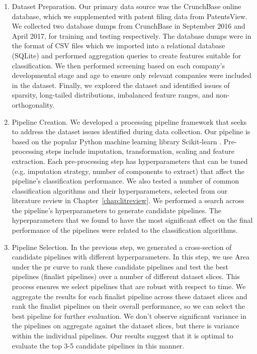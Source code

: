 \documentclass[../thesis/thesis.tex]{subfiles}
\begin{document}
\begin{enumerate}

\item Dataset Preparation. Our primary data source was the CrunchBase online database, which we supplemented with patent filing data from PatentsView. We collected two database dumps from CrunchBase in September 2016 and April 2017, for training and testing respectively. The database dumps were in the format of CSV files which we imported into a relational database (SQLite) and performed aggregation queries to create features suitable for classification. We then performed screening based on each company's developmental stage and age to ensure only relevant companies were included in the dataset. Finally, we explored the dataset and identified issues of sparsity, long-tailed distributions, imbalanced feature ranges, and non-orthogonality.

\item Pipeline Creation. We developed a processing pipeline framework that seeks to address the dataset issues identified during data collection. Our pipeline is based on the popular Python machine learning library Scikit-learn \cite{pedregosa2011}. Pre-processing steps include imputation, transformation, scaling and feature extraction. Each pre-processing step has hyperparameters that can be tuned (e.g. imputation strategy, number of components to extract) that affect the pipeline's classification performance. We also tested a number of common classification algorithms and their hyperparameters, selected from our literature review in Chapter~\ref{chap:litreview}. We performed a search across the pipeline's hyperparameters to generate candidate pipelines. The hyperparameters that we found to have the most significant effect on the final performance of the pipelines were related to the classification algorithms.

\item Pipeline Selection. In the previous step, we generated a cross-section of candidate pipelines with different hyperparameters. In this step, we use Area under the \gls{pr} curve to rank these candidate pipelines and test the best pipelines (finalist pipelines) over a number of different dataset slices. This process ensures we select pipelines that are robust with respect to time. We aggregate the results for each finalist pipeline across these dataset slices and rank the finalist pipelines on their overall performance, so we can select the best pipeline for further evaluation. We don't observe significant variance in the pipelines on aggregate against the dataset slices, but there is variance within the individual pipelines. Our results suggest that it is optimal to evaluate the top 3-5 candidate pipelines in this manner.

\end{enumerate}
\end{document}
